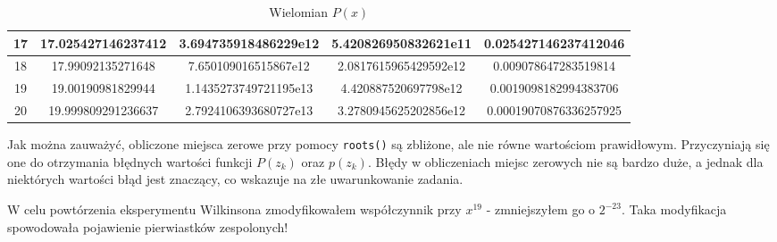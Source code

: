 \documentclass[15pt, a4paper]{article}
\begin{document}
\begin{table}[h]
\begin{adjustbox}{max width=\textwidth}
\begin{tabular}{|c|c|c|c|c|}
        17 & 17.025427146237412 & 3.694735918486229e12 & 5.420826950832621e11 & 0.025427146237412046 \\ \hline
        18 & 17.99092135271648 & 7.650109016515867e12 & 2.0817615965429592e12 & 0.009078647283519814 \\ \hline
        19 & 19.00190981829944 & 1.1435273749721195e13 & 4.420887520697798e12 & 0.0019098182994383706 \\ \hline
        20 & 19.999809291236637 & 2.7924106393680727e13 & 3.2780945625202856e12 & 0.00019070876336257925 \\ \hline
    \end{tabular}
    \end{adjustbox}
    \caption{Wielomian \(P(x)\)}
    \label{wielomian}
\end{table}

\vspace{0.5cm}

\noindent Jak można zauważyć, obliczone miejsca zerowe przy pomocy \verb|roots()| są zbliżone, ale nie równe wartościom prawidłowym. Przyczyniają się one do otrzymania błędnych wartości funkcji \(P(z_k)\) oraz \(p(z_k)\). Błędy w obliczeniach miejsc zerowych nie są bardzo duże, a jednak dla niektórych wartości błąd jest znaczący, co wskazuje na złe uwarunkowanie zadania.

\vspace{0.5cm}

\noindent W celu powtórzenia eksperymentu Wilkinsona zmodyfikowałem współczynnik przy \(x^{19}\) - zmniejszyłem go o \(2^{-23}\). Taka modyfikacja spowodowała pojawienie pierwiastków zespolonych!

\vspace{0.5cm}

\pagebreak
\end{document}
